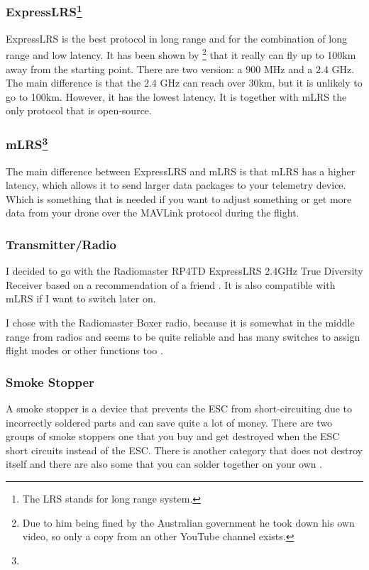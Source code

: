 \documentclass[svgnames]{article}
\begin{document}
	\subsubsection*{ExpressLRS\protect\footnote{The LRS stands for long range system.}}
	ExpressLRS is the best protocol in long range and for the combination of long range and low latency. It has been shown by \textcite{elrswezley}\footnote{Due to him being fined by the Australian government he took down his own video, so only a copy from an other YouTube channel exists.} that it really can fly up to 100km away from the starting point. There are two version: a 900 MHz and a 2.4 GHz. The main difference is that the 2.4 GHz can reach over 30km, but it is unlikely to go to 100km. However, it has the lowest latency. It is together with mLRS the only protocol that is open-source.
	\subsubsection*{mLRS\protect\footnote[8]{}}
	The main difference between ExpressLRS and mLRS is that mLRS has a higher latency, which allows it to send larger data packages to your telemetry device. Which is something that is needed if you want to adjust something or get more data from your drone over the MAVLink protocol during the flight. 
	
	\subsubsection*{Transmitter/Radio}
	I decided to go with the Radiomaster RP4TD ExpressLRS 2.4GHz True Diversity Receiver based on a recommendation of a friend \cite{radiomasterreceiver}. It is also compatible with mLRS if I want to switch later on.
	
	I chose with the Radiomaster Boxer radio, because it is somewhat in the middle range from radios and seems to be quite reliable and has many switches to assign flight modes or other functions too  \cite{radiomasterboxer}. 

	\subsubsection{Smoke Stopper}
	A smoke stopper is a device that prevents the ESC from short-circuiting due to incorrectly soldered parts and can save quite a lot of money. There are two groups of smoke stoppers one that you buy and get destroyed when the ESC short circuits instead of the ESC. There is another category that does not destroy itself and there are also some that you can solder together on your own \cite{smokestopper}. 
	
\end{document}
